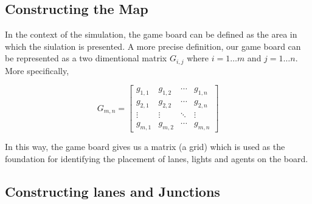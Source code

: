 \subsection{Constructing the Map}

\indent In the context of the simulation, the game board can be defined as the area in which the siulation is presented. A more precise definition, our game board can be represented as a two dimentional matrix $ G_{i,j} $ where $ i = 1 \dots m $ and $ j = 1 \dots n $. More specifically, 

\begin{figure}[h]
\centering  
\[ 
G_{m,n} = 
\begin{bmatrix}
    g_{1,1} & g_{1,2} & \cdots & g_{1,n} \\
    g_{2,1} & g_{2,2} & \cdots & g_{2,n} \\
    \vdots  & \vdots  & \ddots & \vdots  \\
    g_{m,1} & g_{m,2} & \cdots & g_{m,n} 
  \end{bmatrix} \]
\end{figure}

In this way, the game board gives us a matrix (a grid) which is used as the foundation for identifying the placement of lanes, lights and agents on the board. 

\subsection{Constructing lanes and Junctions}

